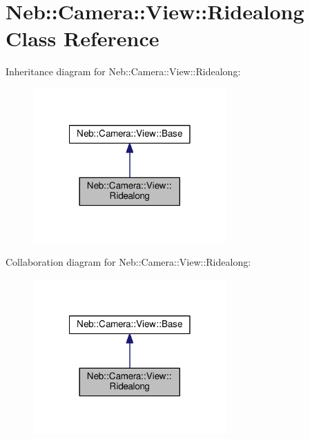 \hypertarget{classNeb_1_1Camera_1_1View_1_1Ridealong}{\section{Neb\-:\-:Camera\-:\-:View\-:\-:Ridealong Class Reference}
\label{classNeb_1_1Camera_1_1View_1_1Ridealong}
}


Inheritance diagram for Neb\-:\-:Camera\-:\-:View\-:\-:Ridealong\-:
\nopagebreak
\begin{figure}[H]
\begin{center}
\leavevmode
\includegraphics[width=210pt]{classNeb_1_1Camera_1_1View_1_1Ridealong__inherit__graph}
\end{center}
\end{figure}


Collaboration diagram for Neb\-:\-:Camera\-:\-:View\-:\-:Ridealong\-:
\nopagebreak
\begin{figure}[H]
\begin{center}
\leavevmode
\includegraphics[width=210pt]{classNeb_1_1Camera_1_1View_1_1Ridealong__coll__graph}
\end{center}
\end{figure}
